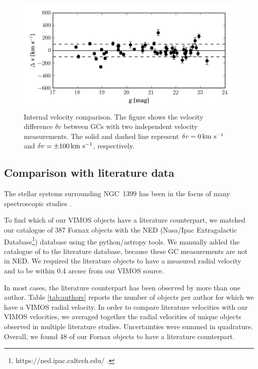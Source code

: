\documentclass[useAMS,usenatbib]{mn2e}
\newcommand{\kms}{\mbox{\,km~s$^{-1}$}}
\begin{document}
\begin{figure}
\centering
\includegraphics[width=\columnwidth]{figures/internal.png} 
\caption{Internal velocity comparison. The figure shows the velocity difference $\delta v$ between GCs with two independent velocity measurements. The solid and dashed line represent $\delta v = 0 \kms$ and $\delta v = \pm 100 \kms$, respectively. }
\label{fig:internal}
\end{figure}

\subsection{Comparison with literature data}

The stellar systems surrounding NGC~1399 has been in the focus of many spectroscopic studies
\citep{Dirsch04, Schuberth10, Bergond07, Firth07, Chilingarian11, Mieske04, Hilker07, Francis12, Drinkwater00}.

To find which of our VIMOS objects have a literature counterpart, we matched our catalogue of 387 Fornax objects with the NED (Nasa/Ipac Extragalactic Database\footnote{https://ned.ipac.caltech.edu/ .}) database using the python/astropy tools. 
We manually added the catalogue of \citet{Schuberth} to the literature database, because these GC measurements are not in NED. We required the literature objects to have a measured radial velocity and to be within 0.4 arcsec from our VIMOS source. 

In most cases, the literature counterpart has been observed by more than one author. Table \ref{tab:authors} reports the number of objects per author for which we have a VIMOS radial velocity. 
In order to compare literature velocities with our VIMOS velocities, we averaged together the radial velocities of unique objects observed in multiple literature studies. Uncertainties were summed in quadrature. 
Overall, we found 48 of our Fornax objects to have a literature counterpart. 
\end{document}
